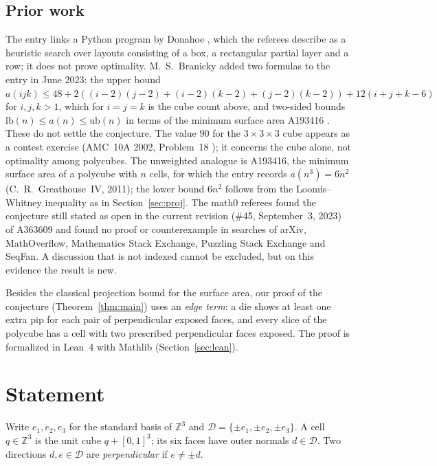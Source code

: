 \documentclass[11pt]{amsart}
\theoremstyle{plain}
\theoremstyle{definition}
\newcommand{\Z}{\mathbb{Z}}
\newcommand{\D}{\mathcal{D}}
\begin{document}
\subsection*{Prior work}
The entry links a Python program by Donahoe \cite{Don}, which the referees describe as a heuristic search over layouts consisting of a box, a rectangular partial layer and a row; it does not prove optimality. M.~S.~Branicky added two formulas to the entry in June 2023: the upper bound $a(ijk)\le 48+2((i-2)(j-2)+(i-2)(k-2)+(j-2)(k-2))+12(i+j+k-6)$ for $i,j,k>1$, which for $i=j=k$ is the cube count above, and two-sided bounds $\mathrm{lb}(n)\le a(n)\le\mathrm{ub}(n)$ in terms of the minimum surface area A193416 \cite{A193416}. These do not settle the conjecture. The value $90$ for the $3\times3\times3$ cube appears as a contest exercise (AMC~10A 2002, Problem~18 \cite{AMC}); it concerns the cube alone, not optimality among polycubes. The unweighted analogue is A193416, the minimum surface area of a polycube with $n$ cells, for which the entry records $a(n^3)=6n^2$ (C.~R.~Greathouse~IV, 2011); the lower bound $6n^2$ follows from the Loomis--Whitney inequality \cite{LW} as in Section~\ref{sec:proj}. The math0 referees found the conjecture still stated as open in the current revision (\#45, September~3, 2023) of A363609 and found no proof or counterexample in searches of arXiv, MathOverflow, Mathematics Stack Exchange, Puzzling Stack Exchange and SeqFan. A discussion that is not indexed cannot be excluded, but on this evidence the result is new.

Besides the classical projection bound for the surface area, our proof of the conjecture (Theorem~\ref{thm:main}) uses an \emph{edge term}: a die shows at least one extra pip for each pair of perpendicular exposed faces, and every slice of the polycube has a cell with two prescribed perpendicular faces exposed. The proof is formalized in Lean~4 with Mathlib (Section~\ref{sec:lean}).

\section{Statement}\label{sec:statement}

Write $e_1,e_2,e_3$ for the standard basis of $\Z^3$ and $\D=\{\pm e_1,\pm e_2,\pm e_3\}$. A cell $q\in\Z^3$ is the unit cube $q+[0,1]^3$; its six faces have outer normals $d\in\D$. Two directions $d,e\in\D$ are \emph{perpendicular} if $e\ne\pm d$.
\end{document}
